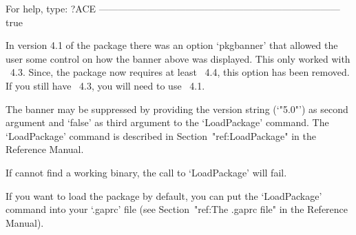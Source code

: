                  For help, type: ?ACE
---------------------------------------------------------------------------
true
\endexample

In version 4.1 of the {\ACE} package there was an  option  `pkgbanner'
that allowed the user  some  control  on  how  the  banner  above  was
displayed. This only worked with {\GAP}~4.3. Since, the {\ACE} package
now requires at least {\GAP}~4.4, this option has been removed. If you
still have {\GAP}~4.3, you will need to use {\ACE}~4.1.

The banner may be suppressed by providing the version string (`"5.0"')
as second argument and `false' as third argument to the  `LoadPackage'
command.    The    `LoadPackage'    command    is     described     in
Section~"ref:LoadPackage" in the {\GAP} Reference Manual.

If {\GAP} cannot find a working binary, the call to `LoadPackage' will
fail.

If you want to load the {\ACE} package by default,  you  can  put  the
`LoadPackage' command into your `.gaprc'  file  (see  Section~"ref:The
.gaprc file" in the {\GAP} Reference Manual).

